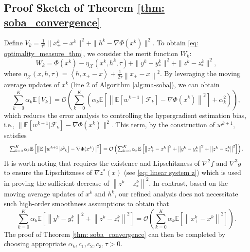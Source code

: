 \documentclass[10pt]{article}
\theoremstyle{remark}
\newcommand{\cO}{\mathcal{O}}
\newcommand{\cX}{\mathcal{X}}
\def\setF{\mathscr{F}} %
\newcommand{\E}{\mathbb{E}}
\newcommand{\norm}[1]{\left\|#1\right\|}
\def\<#1,#2>{\left\langle #1,#2\right\rangle}
\begin{document}
\subsection{Proof Sketch of Theorem \ref{thm: soba_convergence}}\label{sec: bo_analysis} 
Define $V_k = \frac{1}{\tau^2}\|x_+^k - x^k\|^2 + \|h^k - \nabla \Phi(x^k)\|^2$. To obtain \eqref{eq: optimality_measure_thm}, we consider the merit function $W_k$: 
\begin{equation*}
    W_k = \Phi(x^k) - \eta_{\cX}(x^k, h^k, \tau) + \|y^k - y_*^k\|^2 + \|z^k - z_*^k\|^2,
\end{equation*}
where $\eta_{\cX}(x,h,\tau)= \<h, x_+ - x> + \frac{1}{2\tau}\norm{x_+-x}^2$.
By leveraging the moving average updates of $x^k$ (line 2 of Algorithm \ref{alg:ma-soba}), we can obtain
\[
    \sum_{k=0}^{K}\alpha_k\E\left[V_k\right] =\cO\left(\sum_{k=0}^{K}\left(\alpha_k\E\left[\norm{\E\left[w^{k+1}\middle|\setF_k\right] - \nabla \Phi(x^k)}^2\right] + \alpha_k^2\right)\right),
\]
which reduces the error analysis to controlling the hypergradient estimation bias, i.e., $\|\E[w^{k+1}|\setF_k] - \nabla \Phi(x^k)\|^2.$
This term, by the construction of $w^{k+1}$, satisfies
\begin{equation*}
\resizebox{\hsize}{!}{$
\sum_{k=0}^{K}\alpha_k\E\left[\norm{\E\left[w^{k+1}\middle|\setF_k\right] - \nabla \Phi(x^k)}^2\right]= \cO\left(\sum_{k=0}^{K}\alpha_k\E\left[\norm{x_+^k - x^k}^2 + \norm{y^k-y_*^k}^2 + \norm{z^k - z_*^k}^2\right]\right).$}
\end{equation*}
It is worth noting that \cite{dagreou2022framework} requires the existence and Lipschitzness of $\nabla^2 f$ and $\nabla^3g$ to ensure the Lipschitzness of $\nabla z^*(x)$ (see \eqref{eq: linear system z}) which is used in proving the sufficient decrease of $\norm{z^k - z_*^k}^2$. In contrast, based on the moving average updates of $x^k$ and $h^k$, our refined analysis does not necessitate such high-order smoothness assumptions to obtain that
\[
    \sum_{k=0}^{K}\alpha_k\E\left[\norm{y^k-y_*^k}^2 + \norm{z^k - z_*^k}^2\right] = \cO\left(\sum_{k=0}^{K}\alpha_k\E\left[\norm{x_+^k - x^k}^2\right]\right).
\]
The proof of Theorem \ref{thm: soba_convergence} can then be completed by choosing appropriate $\alpha_k, c_1, c_2, c_3, \tau > 0$.
\end{document}

